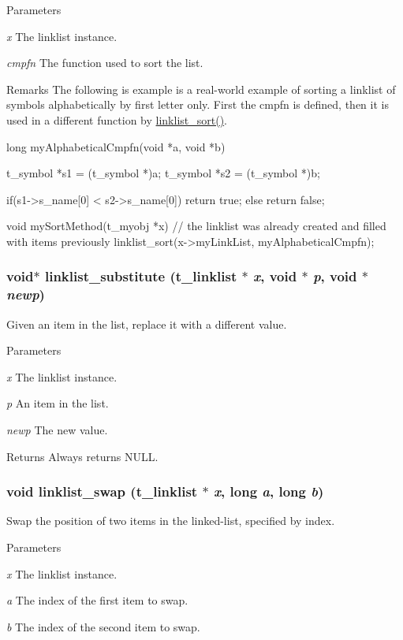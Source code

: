 \begin{DoxyParams}{Parameters}
\item[{\em x}]The linklist instance. \item[{\em cmpfn}]The function used to sort the list.\end{DoxyParams}
\begin{DoxyRemark}{Remarks}
The following is example is a real-\/world example of sorting a linklist of symbols alphabetically by first letter only. First the cmpfn is defined, then it is used in a different function by \hyperlink{group__linklist_gaf01b5f67a8ceccdd75cff34f6ecdd8c2}{linklist\_\-sort()}. 
\begin{DoxyCode}
    long myAlphabeticalCmpfn(void *a, void *b)
    {
        t_symbol *s1 = (t_symbol *)a;
        t_symbol *s2 = (t_symbol *)b;

        if(s1->s_name[0] < s2->s_name[0])
            return true;
        else
            return false;
    }
    
    void mySortMethod(t_myobj *x)
    {
        // the linklist was already created and filled with items previously 
        linklist_sort(x->myLinkList, myAlphabeticalCmpfn);
    }
\end{DoxyCode}
 
\end{DoxyRemark}
\hypertarget{group__linklist_ga498a96abbd74bf7e1885e97a8fb37379}{
\subsubsection[{linklist\_\-substitute}]{\setlength{\rightskip}{0pt plus 5cm}void$\ast$ linklist\_\-substitute ({\bf t\_\-linklist} $\ast$ {\em x}, \/  void $\ast$ {\em p}, \/  void $\ast$ {\em newp})}}
\label{group__linklist_ga498a96abbd74bf7e1885e97a8fb37379}


Given an item in the list, replace it with a different value. 
\begin{DoxyParams}{Parameters}
\item[{\em x}]The linklist instance. \item[{\em p}]An item in the list. \item[{\em newp}]The new value. \end{DoxyParams}
\begin{DoxyReturn}{Returns}
Always returns NULL. 
\end{DoxyReturn}
\hypertarget{group__linklist_ga42d158b9f76d83f58cf6780aeb9b208a}{
\subsubsection[{linklist\_\-swap}]{\setlength{\rightskip}{0pt plus 5cm}void linklist\_\-swap ({\bf t\_\-linklist} $\ast$ {\em x}, \/  long {\em a}, \/  long {\em b})}}
\label{group__linklist_ga42d158b9f76d83f58cf6780aeb9b208a}


Swap the position of two items in the linked-\/list, specified by index. 
\begin{DoxyParams}{Parameters}
\item[{\em x}]The linklist instance. \item[{\em a}]The index of the first item to swap. \item[{\em b}]The index of the second item to swap. \end{DoxyParams}
